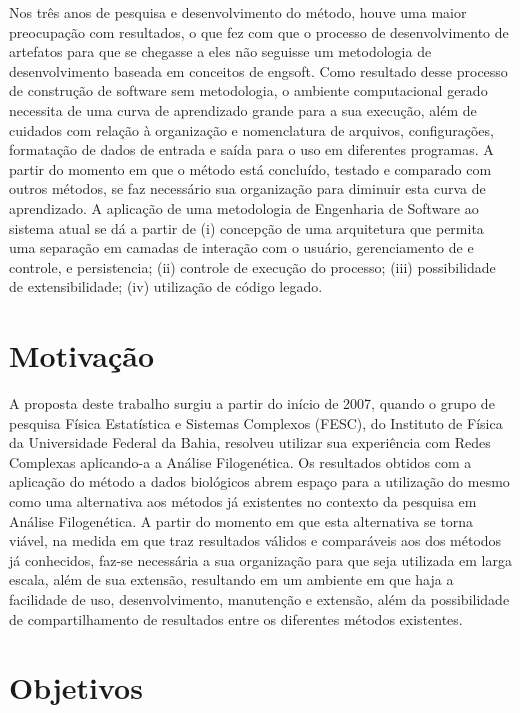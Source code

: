 Nos três anos de pesquisa e desenvolvimento do método, houve uma maior preocupação com resultados, o que fez com que o processo de desenvolvimento de
\gls{artefatos} para que se chegasse a eles não seguisse um metodologia de desenvolvimento baseada em conceitos de \gls{engsoft}. Como
resultado desse processo de construção de software sem metodologia, o ambiente computacional gerado necessita de
uma curva de aprendizado grande para a sua execução, além de cuidados com relação à organização e nomenclatura de arquivos, configurações,
formatação de dados de entrada e saída para o uso em diferentes programas. A partir do momento em que o método está concluído, testado e comparado com
outros métodos, se faz necessário sua organização para diminuir esta curva de aprendizado. A aplicação de uma metodologia de Engenharia de Software ao
sistema atual se dá a partir de (i) concepção de uma arquitetura que permita uma separação em camadas de interação com o usuário, gerenciamento de
e controle, e \gls{persistencia}; (ii) controle de execução do processo; (iii) possibilidade de extensibilidade; (iv) utilização de código legado.

\section{Motivação}

A proposta deste trabalho surgiu a partir do início de 2007, quando o grupo de pesquisa Física Estatística e Sistemas Complexos (FESC),
do Instituto de Física da Universidade Federal da Bahia, resolveu utilizar sua experiência com Redes Complexas aplicando-a a Análise Filogenética.
Os resultados obtidos com a aplicação do método a dados biológicos abrem espaço para a utilização do mesmo como uma alternativa aos métodos
já existentes no contexto da pesquisa em Análise Filogenética. A partir do momento em que esta alternativa se torna viável, na medida em que traz resultados
válidos e comparáveis aos dos métodos já conhecidos,
faz-se necessária a sua organização para que seja utilizada em larga escala, além de sua extensão,
resultando em um ambiente em que haja a facilidade de uso, desenvolvimento, manutenção e extensão, além da possibilidade de compartilhamento de
resultados entre os diferentes métodos existentes.

\section{Objetivos} \label{sec:objetivos}

